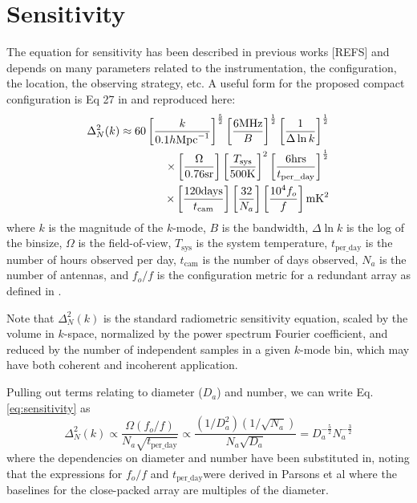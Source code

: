 \documentclass[11pt]{article}
\begin{document}
\section{Sensitivity}

The equation for sensitivity has been described in previous works [REFS] and depends on many parameters
related to the instrumentation, the configuration, the location, the observing strategy, etc.  A useful form for 
the proposed compact configuration is Eq 27 in \citep{Parsonsetal2012} and reproduced here:
\begin{equation}
\centering
\label{eq:sensitivity}
\begin{split}
\Delta^2_N(k) \approx 60 \left[\frac{k}{0.1h\text{Mpc}^{-1}}\right]^\frac{5}{2}
                                         \left[\frac{6 \text{MHz}}{B}\right]^\frac{1}{2}
                                         \left[\frac{1}{\Delta\ln k}\right]^\frac{1}{2} \\
                        \times       \left[\frac{\Omega}{0.76\text{sr}}\right]
                                         \left[\frac{T_\text{sys}}{500 \text{K}}\right]^2
                                         \left[\frac{6 \text{hrs}}{t_\text{per\_day}}\right]^\frac{1}{2} \\
                        \times       \left[\frac{120\text{days}}{t_{\text{cam}}}\right]
                                         \left[\frac{32}{N_a}\right]
                                         \left[\frac{\text{10}^4f_o}{f}\right]  \text{mK}^2
\end{split}
\end{equation}
where $k$ is the magnitude of the $k$-mode, $B$ is the bandwidth, $\Delta\ln k$ is the log
of the binsize, $\Omega$ is the field-of-view, $T_{\text{sys}}$ is the system temperature, 
${t_\text{per\_day}}$ is the number of hours observed per day, $t_{\text{cam}}$ is the number of days
observed, $N_a$ is the number of antennas, and $f_o/f$ is the configuration metric for a 
redundant array as defined in \citep{Parsonsetal2012}.

Note that $\Delta^2_N(k)$ is the standard radiometric sensitivity equation, scaled by
the volume in $k$-space, normalized by the power spectrum Fourier coefficient, and
reduced by the number of independent samples in a given $k$-mode bin, which may have
both coherent and incoherent application.

Pulling out terms relating to diameter ($D_a$) and number, we can write Eq. \ref{eq:sensitivity} as
\begin{equation}
\label{eq:reducedSensitivity}
\Delta^2_N(k) \propto \frac{\Omega (f_o/f)}{N_a\sqrt{t_\text{per\_day}}} \propto \frac{(1/D_a^2)(1/\sqrt{N_a})}{N_a\sqrt{D_a}}
= D_a^{-\frac{5}{2}}N_a^{-\frac{3}{2}}
\end{equation}
where the dependencies on diameter and number have been substituted in, noting that the expressions for $f_o/f$ and 
$t_\text{per\_day}$were derived in Parsons et al where the baselines for the close-packed array are multiples of the diameter.
\end{document}
